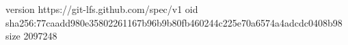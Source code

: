 version https://git-lfs.github.com/spec/v1
oid sha256:77caadd980e35802261167b96b9b80fb460244c225e70a6574a4adcdc0408b98
size 2097248
